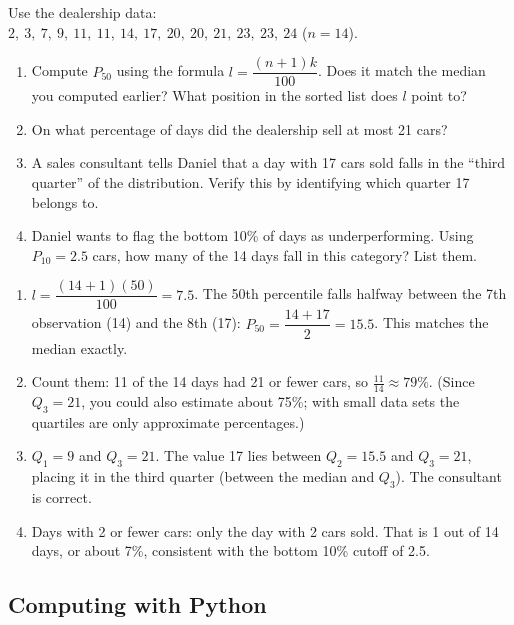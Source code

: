 \begin{Exercise}[title={Relative Standing},
label={ex:percentiles}]
Use the dealership data: \\
$2,\ 3,\ 7,\ 9,\ 11,\ 11,\ 14,\ 17,\ 20,\ 20,\ 21,\ 23,\ 23,\ 24$
($n = 14$).

\begin{enumerate}  
    \item Compute $P_{50}$ using the formula $l = \dfrac{(n+1)k}{100}$.
    Does it match the median you computed earlier? What position in
    the sorted list does $l$ point to?
    \item On what percentage of days did the dealership sell at most
    21 cars?
    \item A sales consultant tells Daniel that a day with 17 cars
    sold falls in the ``third quarter'' of the distribution. Verify
    this by identifying which quarter 17 belongs to.
    \item Daniel wants to flag the bottom 10\% of days as
    underperforming. Using $P_{10} = 2.5$ cars, how many of the 14
    days fall in this category? List them.
\end{enumerate}
\end{Exercise}

\begin{Answer}[ref={ex:percentiles}]
\begin{enumerate}  
    \item $l = \dfrac{(14+1)(50)}{100} = 7.5$. The 50th percentile
    falls halfway between the 7th observation (14) and the 8th (17):
    $P_{50} = \dfrac{14+17}{2} = 15.5$. This matches the median
    exactly.
    \item Count them: 11 of the 14 days had 21 or fewer cars, so
    $\frac{11}{14} \approx 79\%$. (Since $Q_3 = 21$, you could also
    estimate about 75\%; with small data sets the quartiles are only
    approximate percentages.)
    \item $Q_1 = 9$ and $Q_3 = 21$. The value 17 lies between $Q_2
    = 15.5$ and $Q_3 = 21$, placing it in the third quarter (between
    the median and $Q_3$). The consultant is correct.
    \item Days with 2 or fewer cars: only the day with 2 cars sold.
    That is 1 out of 14 days, or about 7\%, consistent with
    the bottom 10\% cutoff of 2.5.
\end{enumerate}
\end{Answer}

\subsection{Computing with Python}

